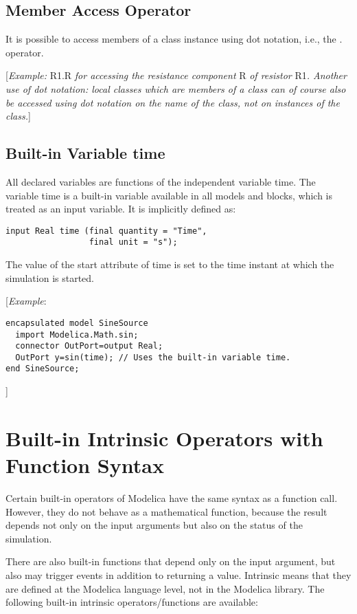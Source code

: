 \subsection{Member Access Operator}

It is possible to access members of a class instance using dot notation,
i.e., the . operator.

{[}\emph{Example:} R1.R \emph{for accessing the resistance component} R
\emph{of resistor} R1\emph{. Another use of dot notation: local classes
which are members of a class can of course also be accessed using dot
notation on the name of the class, not on instances of the class.}{]}

\subsection{Built-in Variable time}

All declared variables are functions of the independent variable time.
The variable time is a built-in variable available in all models and
blocks, which is treated as an input variable. It is implicitly defined
as:
\begin{lstlisting}[language=modelica]
input Real time (final quantity = "Time",
                 final unit = "s");
\end{lstlisting}

The value of the start attribute of time is set to the time instant at
which the simulation is started.

{[}\emph{Example}:
\begin{lstlisting}[language=modelica]
encapsulated model SineSource
  import Modelica.Math.sin;
  connector OutPort=output Real;
  OutPort y=sin(time); // Uses the built-in variable time.
end SineSource;
\end{lstlisting}
{]}

\section{Built-in Intrinsic Operators with Function Syntax}

Certain built-in operators of Modelica have the same syntax as a
function call. However, they do not behave as a mathematical function,
because the result depends not only on the input arguments but also on
the status of the simulation.

There are also built-in functions that depend only on the input
argument, but also may trigger events in addition to returning a value.
Intrinsic means that they are defined at the Modelica language level,
not in the Modelica library. The following built-in intrinsic
operators/functions are available:

